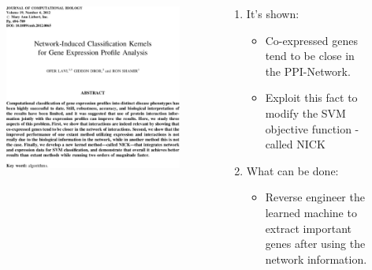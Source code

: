 \documentclass{beamer}
\begin{document}
\begin{frame}
  \begin{columns}
    \begin{column}{0.5\textwidth}
      \begin{figure}
        \includegraphics[width=1\textwidth]{NICK-paper}
      \end{figure}
    \end{column}
    \begin{column}{0.5\textwidth}
      \begin{enumerate}
      \item It's shown:
        \begin{itemize}
        \item Co-expressed genes tend to be close in the PPI-Network.
        \item Exploit this fact to modify the SVM objective function - called NICK
        \end{itemize}
      \item What can be done:
        \begin{itemize}
        \item Reverse engineer the learned machine to extract important genes after using the network information.
        \end{itemize}
      \end{enumerate}
    \end{column}
  \end{columns}
\end{frame}
\end{document}
